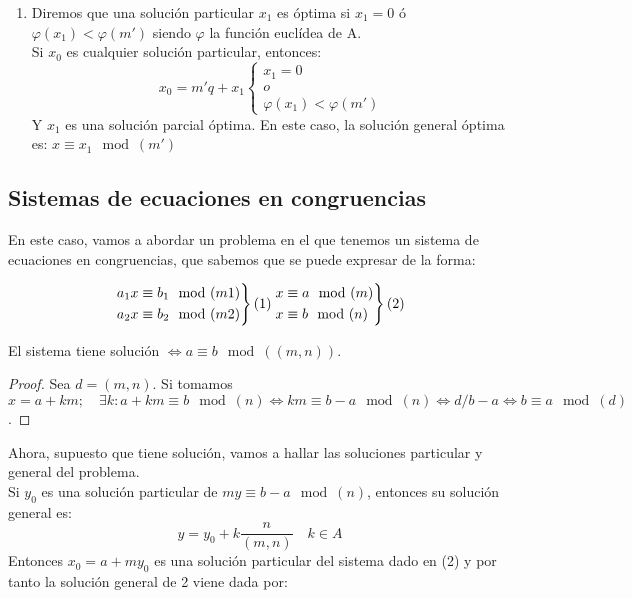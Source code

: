 \begin{nprop}
\begin{itemize}
\begin{enumerate}
\item Diremos que una solución particular $x_1$ es óptima si $x_1 = 0$ ó $\varphi(x_1) < \varphi(m')$ siendo $\varphi$ la función euclídea de A.\\
Si $x_0$ es cualquier solución particular, entonces:
\[
x_0 = m'q + x_1 \begin{cases}
	x_1 = 0\\
	o\\
	\varphi(x_1) < \varphi(m')

\end{cases}
\]
Y $x_1$ es una solución parcial óptima. En este caso, la solución general óptima es: $x\equiv x_1 \mod(m')$
\end{enumerate}
\end{itemize}

\end{nprop}

\subsection{Sistemas de ecuaciones en congruencias}

En este caso, vamos a abordar un problema en el que tenemos un sistema de ecuaciones en congruencias, que sabemos que se puede expresar de la forma:

\[
\begin{rcases}
	a_1x \equiv b_1 \mod(m1)\\
	a_2x \equiv b_2 \mod(m2)
\end{rcases}(1) \begin{rcases}
	x \equiv a \mod(m)\\
	x \equiv b \mod(n)
\end{rcases}(2)
\]

\begin{nth}
	El sistema tiene solución $\iff a \equiv b \mod((m,n))$.
\end{nth}
\begin{proof}
	Sea $d=(m,n)$. Si tomamos $x = a+km; \quad \exists k: a+km \equiv b \mod(n) \iff km \equiv b-a \mod(n) \iff d/b-a \iff b\equiv a\mod(d)$.
\end{proof}

Ahora, supuesto que tiene solución, vamos a hallar las soluciones particular y general del problema.\\
Si $y_0$ es una solución particular de $my \equiv b-a \mod(n)$, entonces su solución general es: $$y = y_0 + k\frac{n}{(m,n)} \quad k \in A$$
Entonces $x_0 = a + my_0$ es una solución particular del sistema dado en (2) y por tanto la solución general de 2 viene dada por:

